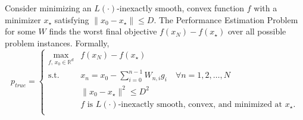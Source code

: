 \documentclass[11pt, hidelinks]{article}
\numberwithin{equation}{section}
\theoremstyle{thmstyletwo}%
\numberwithin{equation}{section}
\newcommand{\R}{\mathbb{R}}
\newcommand{\pPEP}[1]{p_{#1}}
\begin{document}

Consider minimizing an $L(\cdot)$-inexactly smooth, convex function $f$ with a minimizer $x_\star$ satisfying $\|x_0-x_\star\|\leq D$. The Performance Estimation Problem for some $W$ finds the worst final objective $f(x_N)-f(x_\star)$ over all possible problem instances. Formally,
\begin{equation}\label{eq:inexact-PEP}
     \pPEP{true} = \begin{cases}\displaystyle\max_{f, \, x_0 \in \R^d } & f(x_N)-f(x_\star)  \\
    \text{s.t.} & x_n = x_{0} - \sum_{i=0}^{n-1} W_{n,i} g_i \quad \forall n = 1, 2, \dots, N\\
    & \|x_0-x_\star\|^2 \leq D^2 \\
    & f \text{ is $L(\cdot)$-inexactly smooth, convex, and minimized at $x_\star$}. \\
    \end{cases}
  \end{equation}
  
\end{document}
